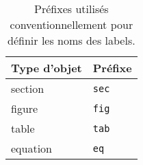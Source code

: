 \documentclass[french]{VGReport}
\begin{document}
\begin{table}[htb]
    \centering
    \begin{tabular}{l l}
        \hline
        \rowcolor{DarkColor}
        \textbf{Type d'objet}   & \textbf{Préfixe}  \\
        \hline
        section                 & \texttt{sec}  \\
        figure                  & \texttt{fig}  \\
        table                   & \texttt{tab}  \\
        equation                & \texttt{eq}   \\
        \hline
    \end{tabular}
    \caption{Préfixes utilisés conventionnellement pour définir les noms des labels.}
    \label{tab:prefixes}
\end{table}
\end{document}
